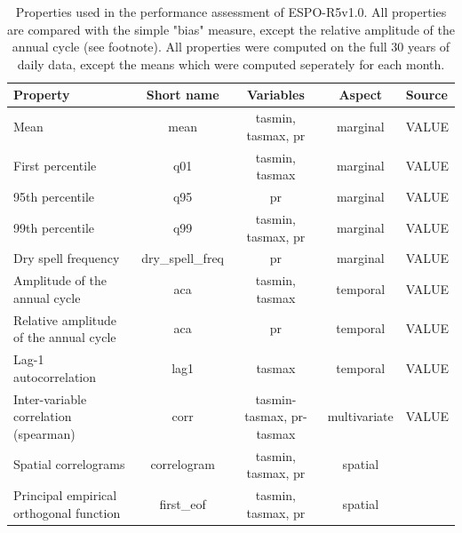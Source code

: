 \documentclass[letterpaper,10pt]{article}
\begin{document}
\begin{table}[!ht]
    \centering
    \caption{Properties used in the performance assessment of ESPO-R5v1.0. All properties are compared with the simple "bias" measure, except the relative amplitude of the annual cycle (see footnote). All properties were computed on the full 30 years of daily data, except the means which were computed seperately for each month.}
    \begin{tabular}{l|c|c|c|l}
    \hline
    Property                               & Short name & Variables          & Aspect   & Source \\ \hline
    Mean                                   & mean       & tasmin, tasmax, pr & marginal & VALUE \\ \hline
    First percentile                       & q01        & tasmin, tasmax     & marginal & VALUE \\ \hline
    95th percentile                        & q95        & pr                 & marginal & VALUE \\ \hline
    99th percentile                        & q99        & tasmin, tasmax, pr & marginal & VALUE \\ \hline
    Dry spell frequency                    & dry\_spell\_freq & pr           & marginal & VALUE \\ \hline
    Amplitude of the annual cycle          & aca        & tasmin, tasmax     & temporal & VALUE \\ \hline
    Relative amplitude of the annual cycle & aca        & pr                 & temporal & VALUE \\ \hline
    Lag-1 autocorrelation                  & lag1       & tasmax             & temporal & VALUE \\ \hline
    Inter-variable correlation (spearman)  & corr       & tasmin-tasmax, pr-tasmax & multivariate & VALUE \\ \hline
    Spatial correlograms                   & correlogram & tasmin, tasmax, pr & spatial & \cite{Francois2020} \\\hline
    Principal empirical orthogonal function& first\_eof & tasmin, tasmax, pr & spatial & \cite{Vrac2018} \\ \hline
    \end{tabular}
    \label{tab:props}

\end{table}
\end{document}
